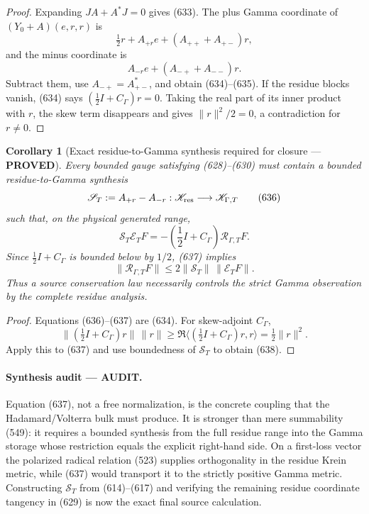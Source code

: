 \documentclass[11pt]{article}
\newtheorem{corollary}[theorem]{Corollary}
\newcommand{\PROVED}{\textcolor{green!45!black}{\textbf{PROVED}}}
\newcommand{\AUDIT}{\textcolor{orange!75!black}{\textbf{AUDIT}}}
\begin{document}
\begin{proof}
Expanding \(JA+A^*J=0\) gives (633).  The plus Gamma coordinate of
\((Y_0+A)(e,r,r)\) is
\[
 \tfrac12r+A_{+r}e+(A_{++}+A_{+-})r,
\]
and the minus coordinate is
\[
 A_{-r}e+(A_{-+}+A_{--})r.
\]
Subtract them, use \(A_{-+}=A_{+-}^*\), and obtain (634)--(635).
If the residue blocks vanish, (634) says
\((\frac12I+C_\Gamma)r=0\).  Taking the real part of its inner product
with \(r\), the skew term disappears and gives
\(\|r\|^2/2=0\), a contradiction for \(r\ne0\).
\end{proof}

\begin{corollary}[Exact residue-to-Gamma synthesis required for closure ---
\PROVED]
Every bounded gauge satisfying (628)--(630) must contain a bounded
residue-to-Gamma synthesis
\begin{equation}
 \mathscr S_T:=A_{+r}-A_{-r}:
 \mathscr K_{\rm res}\longrightarrow\mathscr K_{\Gamma,T}   \tag{636}
\end{equation}
such that, on the physical generated range,
\begin{equation}
 \boxed{
 \mathscr S_T\mathcal E_TF
 =-\left(\frac12I+C_\Gamma\right)
       \mathcal R_{\Gamma,T}F.}                      \tag{637}
\end{equation}
Since \(\frac12I+C_\Gamma\) is bounded below by \(1/2\),
(637) implies
\begin{equation}
 \|\mathcal R_{\Gamma,T}F\|
 \le2\|\mathscr S_T\|\,\|\mathcal E_TF\|.             \tag{638}
\end{equation}
Thus a source conservation law necessarily controls the strict Gamma
observation by the complete residue analysis.
\end{corollary}

\begin{proof}
Equations (636)--(637) are (634).  For skew-adjoint \(C_\Gamma\),
\[
 \|(\tfrac12I+C_\Gamma)r\|\,\|r\|
 \ge\Re\langle(\tfrac12I+C_\Gamma)r,r\rangle
 =\tfrac12\|r\|^2.
\]
Apply this to (637) and use boundedness of \(\mathscr S_T\) to obtain
(638).
\end{proof}

\paragraph{Synthesis audit --- \AUDIT.}
Equation (637), not a free normalization, is the concrete coupling that
the Hadamard/Volterra bulk must produce.  It is stronger than mere
summability (549): it requires a bounded synthesis from the full residue
range into the Gamma storage whose restriction equals the explicit
right-hand side.  On a first-loss vector the polarized radical relation
(523) supplies orthogonality in the residue Krein metric, while (637)
would transport it to the strictly positive Gamma metric.  Constructing
\(\mathscr S_T\) from (614)--(617) and verifying the remaining residue
coordinate tangency in (629) is now the exact final source calculation.
\end{document}
